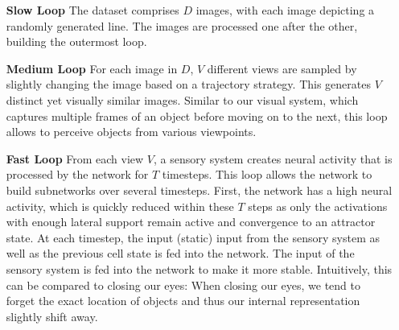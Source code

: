 \begin{itemize}
\item[\textbf{Slow Loop}] The dataset comprises $D$ images, with each image depicting a randomly generated line. The images are processed one after the other, building the outermost loop.
\item[\textbf{Medium Loop}] For each image in $D$, $V$ different views are sampled by slightly changing the image based on a trajectory strategy. This generates $V$ distinct yet visually similar images. Similar to our visual system, which captures multiple frames of an object before moving on to the next, this loop allows to perceive objects from various viewpoints.
\item[\textbf{Fast Loop}] From each view $V$, a sensory system creates neural activity that is processed by the network for $T$ timesteps. This loop allows the network to build subnetworks over several timesteps. First, the network has a high neural activity, which is quickly reduced within these $T$ steps as only the activations with enough lateral support remain active and convergence to an attractor state. At each timestep, the input (static) input from the sensory system as well as the previous cell state is fed into the network. The input of the sensory system is fed into the network to make it more stable. Intuitively, this can be compared to closing our eyes: When closing our eyes, we tend to forget the exact location of objects and thus our internal representation slightly shift away.
\end{itemize}


